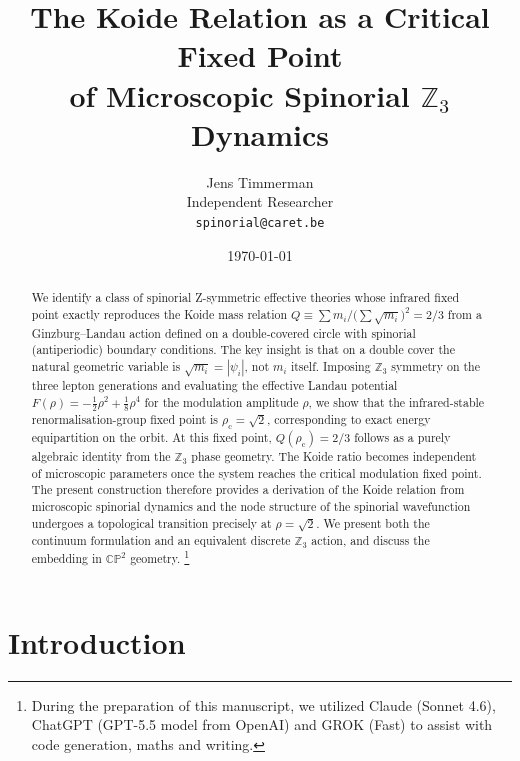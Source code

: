 \documentclass[12pt,a4paper]{article}
\theoremstyle{definition}
\newcommand{\rhoc}{\rho_{\mathrm{c}}}
\begin{document}
\title{\textbf{The Koide Relation as a Critical Fixed Point\\
of Microscopic Spinorial $\mathbb{Z}_3$ Dynamics}}

\author{%
  Jens Timmerman\\[4pt]
  \small Independent Researcher\\
  \small \texttt{spinorial@caret.be}
}

\date{\today}

\maketitle

\begin{abstract}
We identify a class of spinorial Z-symmetric effective theories whose infrared fixed point exactly reproduces the Koide mass relation $Q \equiv \sum m_i / \bigl(\sum \sqrt{m_i}\bigr)^2 = 2/3$
from a Ginzburg--Landau action defined on a double-covered circle with spinorial (antiperiodic)
boundary conditions.
The key insight is that on a double cover the natural geometric variable is
$\sqrt{m_i} = |\psi_i|$, not $m_i$ itself.
Imposing $\mathbb{Z}_3$ symmetry on the three lepton generations and evaluating the
effective Landau potential $F(\rho) = -\tfrac{1}{2}\rho^2 + \tfrac{1}{8}\rho^4$ for the
modulation amplitude $\rho$, we show that the infrared-stable renormalisation-group fixed point
is $\rhoc = \sqrt{2}$, corresponding to exact energy equipartition on the orbit.
At this fixed point, $Q(\rhoc) = 2/3$ follows as a purely algebraic identity from the
$\mathbb{Z}_3$ phase geometry. The Koide ratio becomes independent of microscopic parameters once the system reaches the critical modulation fixed point.
The present construction therefore provides a derivation
of the Koide relation from microscopic spinorial dynamics
and the node structure of the
spinorial wavefunction undergoes a topological transition precisely at $\rho = \sqrt{2}$.
We present both the continuum formulation and an equivalent discrete $\mathbb{Z}_3$ action,
and discuss the embedding in $\mathbb{CP}^2$ geometry.
    \footnote {During the preparation of this manuscript, we utilized Claude (Sonnet 4.6), ChatGPT (GPT-5.5 model from OpenAI) and GROK (Fast) to assist with code generation, maths and writing.}
\end{abstract}

\newpage
\tableofcontents
\newpage


\section{Introduction}
\label{sec:intro}
\end{document}
